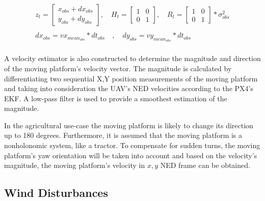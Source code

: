 \documentclass[conference]{IEEEtran}
\begin{document}
\begin{equation}
    \begin{array}{l}
    z_{t} = \begin{bmatrix} 
                x_{obs} + dx_{obs} \\ 
                y_{obs} + dy_{obs}
                \end{bmatrix}, \quad 


    
    H_{t}= \begin{bmatrix} 
                1 & 0 \\ 
                0 & 1
                \end{bmatrix}, \quad
    R_{t} = \begin{bmatrix} 
                1 & 0 \\ 
                0 & 1
                \end{bmatrix}*\sigma^{2}_{obs}  \\ \\
                
dx_{obs} = vx_{mean_{obs}} * dt_{obs} \quad , \quad
    dy_{obs} = vy_{mean_{obs}} * dt_{obs} \quad \\
          
    \end{array}
\end{equation}

A velocity estimator is also constructed to determine the magnitude and direction of the moving platform's velocity vector. The magnitude is calculated by differentiating two sequential X,Y position measurements of the moving platform and taking into consideration the UAV's NED velocities according to the PX4's EKF. A low-pass filter is used to provide a smoothest estimation of the magnitude. 

In the agricultural use-case the moving platform is likely to change its direction up to 180 degrees. Furthermore, it is assumed that the moving platform is a nonholonomic system, like a tractor. To compensate for sudden turns, the moving platform's yaw orientation will be taken into account and based on the velocity's magnitude, the moving platform's velocity in \(x,y\) NED frame can be obtained.



\subsection{Wind Disturbances}
\label{WindDisturbances}
\end{document}
